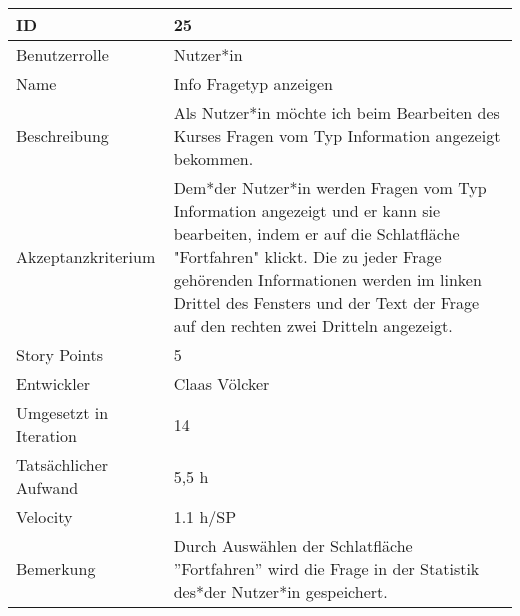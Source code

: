 \begin{tabularx}{\textwidth}{|p{}|X|}
	\hline
	ID & 25\\
	\hline
	Benutzerrolle & Nutzer*in\\
	\hline
	Name & Info Fragetyp anzeigen\\
	\hline
	Beschreibung & Als Nutzer*in möchte ich beim Bearbeiten des Kurses Fragen vom Typ Information angezeigt bekommen.\\
	\hline
	Akzeptanzkriterium & Dem*der Nutzer*in werden Fragen vom Typ Information angezeigt und er kann sie bearbeiten, indem er auf die Schlatfläche "Fortfahren" klickt. Die zu jeder Frage gehörenden Informationen werden im linken Drittel des Fensters und der Text der Frage auf den rechten zwei Dritteln angezeigt.\\
	\hline
	Story Points & 5 \\
	\hline
	Entwickler & Claas Völcker \\
	\hline
	Umgesetzt in Iteration & 14\\
	\hline
	Tatsächlicher Aufwand & 5,5 h\\
	\hline
	Velocity & 1.1 h/SP\\
	\hline
	Bemerkung & Durch Auswählen der Schlatfläche ''Fortfahren'' wird die Frage in der Statistik des*der Nutzer*in gespeichert.\\
	\hline
\end{tabularx}
\vspace{20pt}

